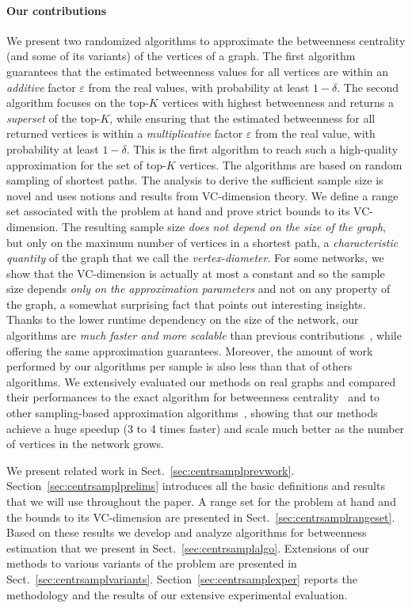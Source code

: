 \paragraph*{Our contributions} 
We present two randomized algorithms to approximate the betweenness centrality
(and some of its variants) of the vertices of a graph. The first algorithm
guarantees that the estimated betweenness values for all vertices are within an
\emph{additive} factor $\varepsilon$ from the real values, with probability at
least $1-\delta$. The second algorithm focuses on the top-$K$ vertices with
highest betweenness and returns a \emph{superset} of the top-$K$,
while ensuring that the estimated betweenness for all returned vertices is
within a \emph{multiplicative} factor $\varepsilon$ from the real value, with
probability at least $1-\delta$. This is the first algorithm to reach such a
high-quality approximation for the set of top-$K$ vertices. The algorithms are
based on random sampling of shortest paths. The analysis to derive the
sufficient sample size is novel and uses notions and results from VC-dimension
theory. We define a range set associated with the problem at hand and prove strict
bounds to its VC-dimension. The resulting sample size \emph{does not
depend on the size of the graph}, but only on the maximum number of vertices
in a shortest path, a \emph{characteristic quantity} of the graph that we call
the \emph{vertex-diameter}. For some networks, we show that the VC-dimension is
actually
at most a constant and so the sample size depends \emph{only on the approximation
parameters} and not on any property of the graph, a somewhat surprising fact
that points out interesting insights. Thanks to the lower runtime dependency on
the size of the network, our algorithms are \emph{much faster and more scalable}
than previous contributions~\citep{JacobKLPT05,BrandesP07,GeisbergerSS08}, while
offering the same approximation guarantees. Moreover, the amount of work
performed by our algorithms per sample is also less than that of others algorithms.
We extensively evaluated our methods on real graphs and compared their
performances to the exact algorithm for betweenness centrality~\citep{Brandes01}
and to other sampling-based approximation
algorithms~\citep{JacobKLPT05,BrandesP07,GeisbergerSS08}, showing that our
methods achieve a huge speedup (3 to 4 times faster) and scale much better as
the number of vertices in the network grows.

We present related work in Sect.~\ref{sec:centrsamplprevwork}. Section~\ref{sec:centrsamplprelims}
introduces all the basic definitions and results that we will use throughout the
paper. A range set for the problem at hand and the bounds to its VC-dimension
are presented in Sect.~\ref{sec:centrsamplrangeset}. Based on these results we develop and
analyze algorithms for betweenness estimation that we present in
Sect.~\ref{sec:centrsamplalgo}. %
\ifproof
Extensions of our methods to various variants of the problem are presented in
Sect.~\ref{sec:centrsamplvariants}. %
\fi 
Section~\ref{sec:centrsamplexper} reports the methodology and
the results of our extensive experimental evaluation.

